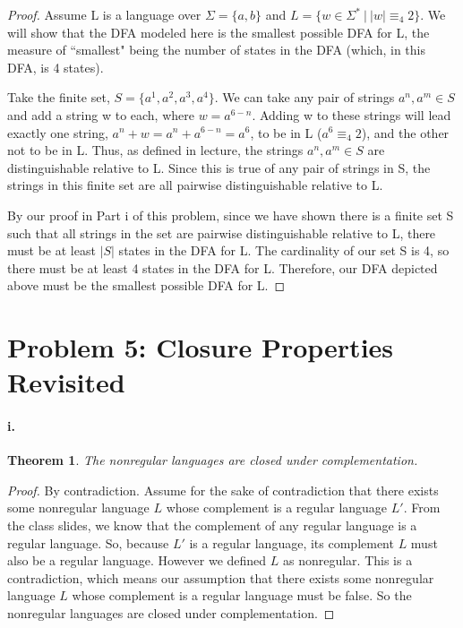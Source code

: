 \documentclass[10pt,letter]{article}
\newtheorem*{thm}{Theorem}
\begin{document}
\begin{proof} Assume L is a language over $\Sigma = \{a,b\}$ and $L=\{w \in \Sigma^*\ |\ |w| \equiv_4 2\}$. We will show that the DFA modeled here is the smallest possible DFA for L, the measure of ``smallest" being the number of states in the DFA (which, in this DFA, is 4 states). 

Take the finite set, $S = \{a^1, a^2, a^3, a^4\}$. We can take any pair of strings $a^n, a^m \in S$ and add a string w to each, where $w = a^{6-n}$. Adding w to these strings will lead exactly one string, $a^n + w = a^n+a^{6-n} = a^6$, to be in L ($a^6 \equiv_4 2$), and the other not to be in L. Thus, as defined in lecture, the strings $a^n, a^m \in S$ are distinguishable relative to L. Since this is true of any pair of strings in S, the strings in this finite set are all pairwise distinguishable relative to L.

By our proof in Part i of this problem, since we have shown there is a finite set S such that all strings in the set are pairwise distinguishable relative to L, there must be at least $|S|$ states in the DFA for L. The cardinality of our set S is 4, so there must be at least 4 states in the DFA for L. Therefore, our DFA depicted above must be the smallest possible DFA for L. 
\end{proof}

\section*{Problem 5: Closure Properties Revisited}
\paragraph{i.}
\begin{thm} The nonregular languages are closed under complementation. \end{thm}
\begin{proof}
By contradiction. Assume for the sake of contradiction that there exists some nonregular language $L$ whose complement is a regular language $L'$. From the class slides, we know that the complement of any regular language is a regular language. So, because $L'$ is a regular language, its complement $L$ must also be a regular language. However we defined $L$ as nonregular. This is a contradiction, which means our assumption that there exists some nonregular language $L$ whose complement is a regular language must be false. So the nonregular languages are closed under complementation.
\end{proof}
\end{document}
